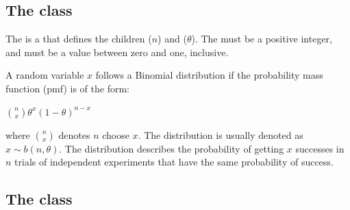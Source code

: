 
\subsection{The  class}
\label{BinomialDistribution-class}
\label{binomialdistribution-class}

The \BinomialDistribution is a \DiscreteUnivariateDistribution that defines the \UncertValue children  ($n$) and  ($\theta$).  The  must be a positive integer, and  must be a value between zero and one, inclusive.

A random variable $ x $ follows a Binomial distribution if the probability mass function (pmf) is of the form:

\begin{center}
${n \choose x} \theta^x (1-\theta)^{n-x} $
\end{center}

where $ {n \choose x} $ denotes $ n $ choose $ x $. The distribution is usually denoted as $ x \sim b(n,\theta) $. The distribution describes the probability of getting $ x $ successes in $n$ trials of independent experiments that have the same probability of success.

\subsection{The  class}
\label{GeometricDistribution-class}
\label{geometricdistribution-class}

